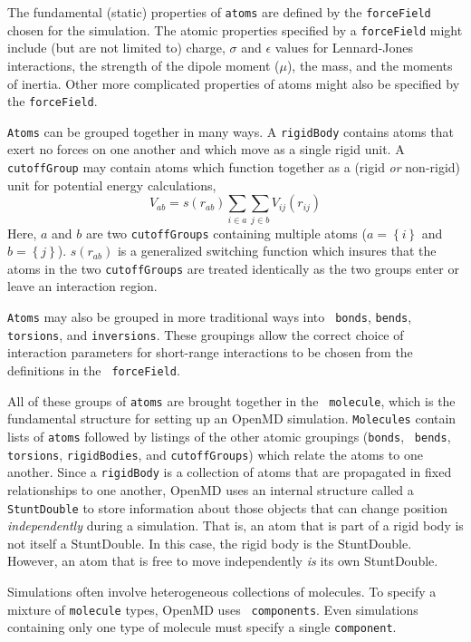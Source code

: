 \documentclass[letterpaper]{report}
\begin{document}
The fundamental (static) properties of {\tt atoms} are defined by the
{\tt forceField} chosen for the simulation.  The atomic properties
specified by a {\tt forceField} might include (but are not limited to)
charge, $\sigma$ and $\epsilon$ values for Lennard-Jones interactions,
the strength of the dipole moment ($\mu$), the mass, and the moments
of inertia.  Other more complicated properties of atoms might also be
specified by the {\tt forceField}.

{\tt Atoms} can be grouped together in many ways.  A {\tt rigidBody}
contains atoms that exert no forces on one another and which move as a
single rigid unit.  A {\tt cutoffGroup} may contain atoms which
function together as a (rigid {\it or} non-rigid) unit for potential
energy calculations,
\begin{equation}
V_{ab} = s(r_{ab}) \sum_{i \in a} \sum_{j \in b} V_{ij}(r_{ij})
\end{equation}
Here, $a$ and $b$ are two {\tt cutoffGroups} containing multiple atoms
($a = \left\{i\right\}$ and $b = \left\{j\right\}$).  $s(r_{ab})$ is a
generalized switching function which insures that the atoms in the two
{\tt cutoffGroups} are treated identically as the two groups enter or
leave an interaction region.

{\tt Atoms} may also be grouped in more traditional ways into {\tt
  bonds}, {\tt bends}, {\tt torsions}, and {\tt inversions}.  These
groupings allow the correct choice of interaction parameters for
short-range interactions to be chosen from the definitions in the {\tt
  forceField}.

All of these groups of {\tt atoms} are brought together in the {\tt
molecule}, which is the fundamental structure for setting up an
OpenMD simulation.  {\tt Molecules} contain lists of {\tt atoms}
followed by listings of the other atomic groupings ({\tt bonds}, {\tt
bends}, {\tt torsions}, {\tt rigidBodies}, and {\tt cutoffGroups})
which relate the atoms to one another.  Since a {\tt rigidBody} is a
collection of atoms that are propagated in fixed relationships to one
another, OpenMD uses an internal structure called a {\tt
StuntDouble} to store information about those objects that can change
position {\it independently} during a simulation.  That is, an atom
that is part of a rigid body is not itself a StuntDouble.  In this
case, the rigid body is the StuntDouble.  However, an atom that is
free to move independently {\it is} its own StuntDouble.

Simulations often involve heterogeneous collections of molecules.  To
specify a mixture of {\tt molecule} types, OpenMD uses {\tt
components}.  Even simulations containing only one type of molecule
must specify a single {\tt component}.
\end{document}
